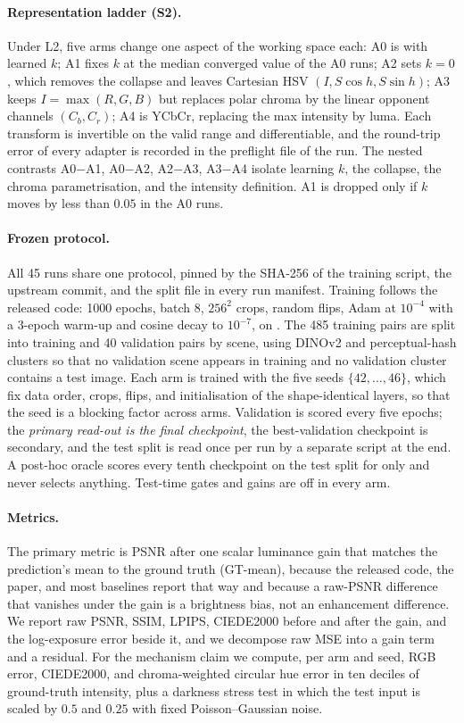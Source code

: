 \paragraph{Representation ladder (S2).} Under L2, five arms change one aspect of the working
space each: A0 is \hvi with learned $k$; A1 fixes $k$ at the median converged value of the A0
runs; A2 sets $k = 0$, which removes the collapse and leaves Cartesian HSV
$(I, S\cos h, S\sin h)$; A3 keeps $I = \max(R,G,B)$ but replaces polar chroma by the linear
opponent channels $(C_b, C_r)$; A4 is YCbCr, replacing the max intensity by luma. Each
transform is invertible on the valid range and differentiable, and the round-trip error of
every adapter is recorded in the preflight file of the run. The nested contrasts
A0$-$A1, A0$-$A2, A2$-$A3, A3$-$A4 isolate learning $k$, the collapse, the chroma
parametrisation, and the intensity definition. A1 is dropped only if $k$ moves by less than
$0.05$ in the A0 runs.

\paragraph{Frozen protocol.} All 45 runs share one protocol, pinned by the SHA-256 of the
training script, the upstream commit, and the split file in every run manifest. Training
follows the released code: 1000 epochs, batch 8, $256^2$ crops, random flips, Adam at
$10^{-4}$ with a 3-epoch warm-up and cosine decay to $10^{-7}$, on \hw. The 485
\dataset training pairs are split into  training and 40 validation pairs by scene, using
DINOv2 and perceptual-hash clusters so that no validation scene appears in training and no
validation cluster contains a test image. Each arm is trained with the five seeds
$\{42, \dots, 46\}$, which fix data order, crops, flips, and initialisation of the
shape-identical layers, so that the seed is a blocking factor across arms. Validation is
scored every five epochs; the \emph{primary read-out is the final checkpoint}, the
best-validation checkpoint is secondary, and the test split is read once per run by a
separate script at the end. A post-hoc oracle scores every tenth checkpoint on the test
split for  only and never selects anything. Test-time gates and gains
are off in every arm.

\paragraph{Metrics.} The primary metric is PSNR after one scalar luminance gain that matches
the prediction's mean to the ground truth (GT-mean), because the released code, the paper,
and most baselines report \dataset that way and because a raw-PSNR difference that vanishes
under the gain is a brightness bias, not an enhancement difference. We report raw PSNR, SSIM,
LPIPS, CIEDE2000 before and after the gain, and the log-exposure error beside it, and we
decompose raw MSE into a gain term and a residual. For the mechanism claim we compute, per
arm and seed, RGB error, CIEDE2000, and chroma-weighted circular hue error in ten deciles of
ground-truth intensity, plus a darkness stress test in which the test input is scaled by
$0.5$ and $0.25$ with fixed Poisson--Gaussian noise.

